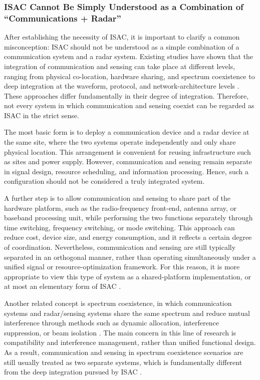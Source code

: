 \subsubsection{ISAC Cannot Be Simply Understood as a Combination of ``Communications + Radar''}
\label{subsubsec:ch1-isac-not-simple-combination}

After establishing the necessity of ISAC, it is important to clarify a common misconception: ISAC should not be understood as a simple combination of a communication system and a radar system. Existing studies have shown that the integration of communication and sensing can take place at different levels, ranging from physical co-location, hardware sharing, and spectrum coexistence to deep integration at the waveform, protocol, and network-architecture levels \cite{Liu2022ISAC,Zhang2021ISAC6G}. These approaches differ fundamentally in their degree of integration. Therefore, not every system in which communication and sensing coexist can be regarded as ISAC in the strict sense.

The most basic form is to deploy a communication device and a radar device at the same site, where the two systems operate independently and only share physical location. This arrangement is convenient for reusing infrastructure such as sites and power supply. However, communication and sensing remain separate in signal design, resource scheduling, and information processing. Hence, such a configuration should not be considered a truly integrated system.

A further step is to allow communication and sensing to share part of the hardware platform, such as the radio-frequency front-end, antenna array, or baseband processing unit, while performing the two functions separately through time switching, frequency switching, or mode switching. This approach can reduce cost, device size, and energy consumption, and it reflects a certain degree of coordination. Nevertheless, communication and sensing are still typically separated in an orthogonal manner, rather than operating simultaneously under a unified signal or resource-optimization framework. For this reason, it is more appropriate to view this type of system as a shared-platform implementation, or at most an elementary form of ISAC \cite{Hassanien2015dual}.

Another related concept is spectrum coexistence, in which communication systems and radar/sensing systems share the same spectrum and reduce mutual interference through methods such as dynamic allocation, interference suppression, or beam isolation \cite{Liu2020JointRadarComm}. The main concern in this line of research is compatibility and interference management, rather than unified functional design. As a result, communication and sensing in spectrum coexistence scenarios are still usually treated as two separate systems, which is fundamentally different from the deep integration pursued by ISAC \cite{Liu2022ISAC}.

